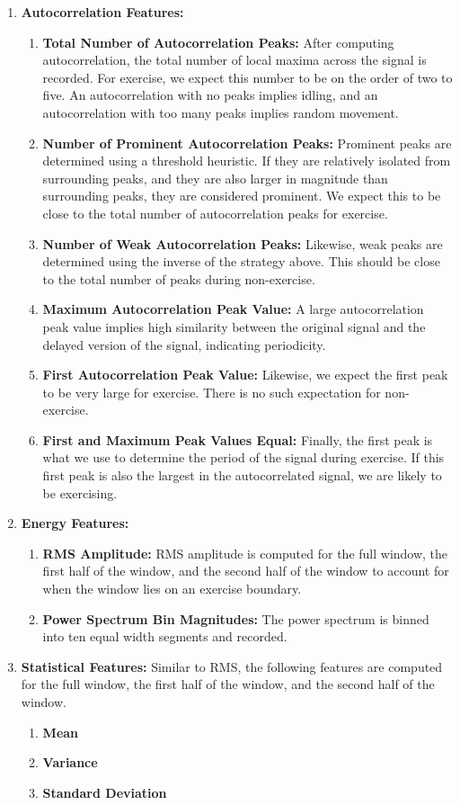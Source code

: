 \begin{enumerate}
    \item \textbf{Autocorrelation Features:}
    \begin{enumerate}
        \item \textbf{Total Number of Autocorrelation Peaks:} After computing autocorrelation, the total number of local maxima across the signal is recorded. For exercise, we expect this number to be on the order of two to five. An autocorrelation with no peaks implies idling, and an autocorrelation with too many peaks implies random movement.
        \item \textbf{Number of Prominent Autocorrelation Peaks:} Prominent peaks are determined using a threshold heuristic. If they are relatively isolated from surrounding peaks, and they are also larger in magnitude than surrounding peaks, they are considered prominent. We expect this to be close to the total number of autocorrelation peaks for exercise.
        \item \textbf{Number of Weak Autocorrelation Peaks:} Likewise, weak peaks are determined using the inverse of the strategy above. This should be close to the total number of peaks during non-exercise.
        \item \textbf{Maximum Autocorrelation Peak Value:} A large autocorrelation peak value implies high similarity between the original signal and the delayed version of the signal, indicating periodicity.
        \item \textbf{First Autocorrelation Peak Value:} Likewise, we expect the first peak to be very large for exercise. There is no such expectation for non-exercise.
        \item \textbf{First and Maximum Peak Values Equal:} Finally, the first peak is what we use to determine the period of the signal during exercise. If this first peak is also the largest in the autocorrelated signal, we are likely to be exercising.
    \end{enumerate}        
    \item \textbf{Energy Features:}
    \begin{enumerate}
        \item \textbf{RMS Amplitude:} RMS amplitude is computed for the full window, the first half of the window, and the second half of the window to account for when the window lies on an exercise boundary.
        \item \textbf{Power Spectrum Bin Magnitudes:} The power spectrum is binned into ten equal width segments and recorded. 
    \end{enumerate}
    \item \textbf{Statistical Features:} Similar to RMS, the following features are computed for the full window, the first half of the window, and the second half of the window. 
    \begin{enumerate}
        \item \textbf{Mean} 
        \item \textbf{Variance}
        \item \textbf{Standard Deviation}
    \end{enumerate}
\end{enumerate}

